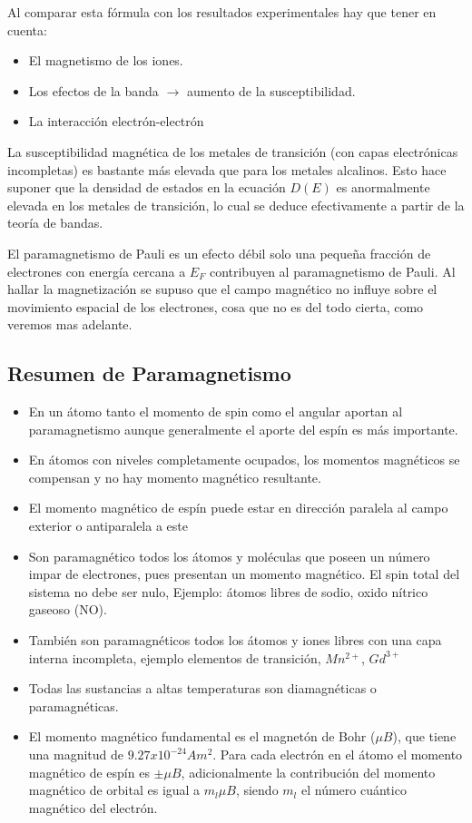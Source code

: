 Al comparar esta fórmula con los resultados experimentales hay que tener en cuenta:

\begin{itemize}
	\item El magnetismo de los iones.
	\item Los efectos de la banda $\rightarrow$ aumento de la susceptibilidad.
	\item La interacción electrón-electrón
\end{itemize}
La susceptibilidad magnética de los metales de transición (con capas electrónicas incompletas) es bastante más elevada que para los metales alcalinos. Esto hace suponer que la densidad de estados en la ecuación $D(E)$ es anormalmente elevada en los metales de transición, lo cual se deduce efectivamente a partir de la teoría de bandas.

El paramagnetismo de Pauli es un efecto débil solo una pequeña fracción de electrones con energía cercana a $E_{F}$ contribuyen al paramagnetismo de Pauli. Al hallar la magnetización se supuso que el campo magnético no influye sobre el movimiento espacial de los electrones, cosa que no es del todo cierta, como veremos mas adelante.

\subsection{Resumen de Paramagnetismo}

\begin{itemize}
	\item En un átomo tanto el momento de spin como el angular aportan al paramagnetismo aunque generalmente el aporte del espín es más importante.
	\item En átomos con niveles completamente ocupados, los momentos magnéticos se compensan y no
hay momento magnético resultante.
	\item El momento magnético de espín puede estar en dirección paralela al campo exterior o antiparalela a
este
	\item Son paramagnético todos los átomos y moléculas que poseen un número impar de electrones, pues presentan un momento magnético. El spin total del sistema no debe ser nulo, Ejemplo: átomos libres de sodio, oxido nítrico gaseoso (NO).
	\item También son paramagnéticos todos los átomos y iones libres con una capa interna incompleta, ejemplo elementos de transición, $Mn^{2+}$, $Gd^{3+}$
	\item Todas las sustancias a altas temperaturas son diamagnéticas o paramagnéticas.
	\item El momento magnético fundamental es el magnetón de Bohr ($\mu B$), que tiene una magnitud de  $9.27x10^{-24} Am^{2}$. Para cada electrón en el átomo el momento magnético de espín es $\pm\mu B$, adicionalmente la contribución del momento magnético de orbital es igual a $m_{l}\mu B$, siendo $m_{l}$ el número cuántico magnético del electrón.
\end{itemize}


